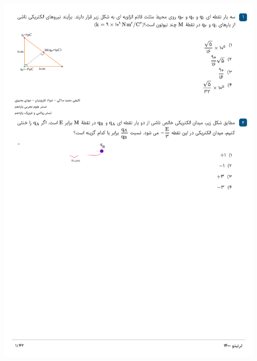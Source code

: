 \documentclass{book}
\begin{document}
\noindent\includegraphics[width=\textwidth]{"pages/1"}
\end{document}
